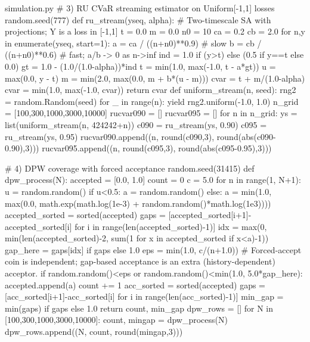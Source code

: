 \begin{filecontents*}{simulation.py}
    # 3) RU CVaR streaming estimator on Uniform[-1,1] losses
    random.seed(777)
    def ru_stream(yseq, alpha):
        # Two-timescale SA with projections; Y is a loss in [-1,1]
        t = 0.0
        m = 0.0
        n0 = 10
        ca = 0.2
        cb = 2.0
        for n,y in enumerate(yseq, start=1):
            a = ca / ((n+n0)**0.9)  # slow
            b = cb / ((n+n0)**0.6)  # fast; a/b -> 0 as n->inf
            ind = 1.0 if (y>t) else (0.5 if y==t else 0.0)
            gt = 1.0 - (1.0/(1.0-alpha))*ind
            t = min(1.0, max(-1.0, t - a*gt))
            u = max(0.0, y - t)
            m = min(2.0, max(0.0, m + b*(u - m)))
        cvar = t + m/(1.0-alpha)
        cvar = min(1.0, max(-1.0, cvar))
        return cvar
    def uniform_stream(n, seed):
        rng2 = random.Random(seed)
        for _ in range(n):
            yield rng2.uniform(-1.0, 1.0)
    n_grid = [100,300,1000,3000,10000]
    rucvar090 = []
    rucvar095 = []
    for n in n_grid:
        ys = list(uniform_stream(n, 424242+n))
        c090 = ru_stream(ys, 0.90)
        c095 = ru_stream(ys, 0.95)
        rucvar090.append((n, round(c090,3), round(abs(c090-0.90),3)))
        rucvar095.append((n, round(c095,3), round(abs(c095-0.95),3)))

    # 4) DPW coverage with forced acceptance
    random.seed(31415)
    def dpw_process(N):
        accepted = [0.0, 1.0]
        count = 0
        c = 5.0
        for n in range(1, N+1):
            u = random.random()
            if u<0.5:
                a = random.random()
            else:
                a = min(1.0, max(0.0, math.exp(math.log(1e-3) + random.random()*math.log(1e3))))
            accepted_sorted = sorted(accepted)
            gaps = [accepted_sorted[i+1]-accepted_sorted[i] for i in range(len(accepted_sorted)-1)]
            idx = max(0, min(len(accepted_sorted)-2, sum(1 for x in accepted_sorted if x<a)-1))
            gap_here = gaps[idx] if gaps else 1.0
            eps = min(1.0, c/(n+1.0))
            # Forced-accept coin is independent; gap-based acceptance is an extra (history-dependent) acceptor.
            if random.random()<eps or random.random()<min(1.0, 5.0*gap_here):
                accepted.append(a)
                count += 1
        acc_sorted = sorted(accepted)
        gaps = [acc_sorted[i+1]-acc_sorted[i] for i in range(len(acc_sorted)-1)]
        min_gap = min(gaps) if gaps else 1.0
        return count, min_gap
    dpw_rows = []
    for N in [100,300,1000,3000,10000]:
        count, mingap = dpw_process(N)
        dpw_rows.append((N, count, round(mingap,3)))


\end{filecontents*}
